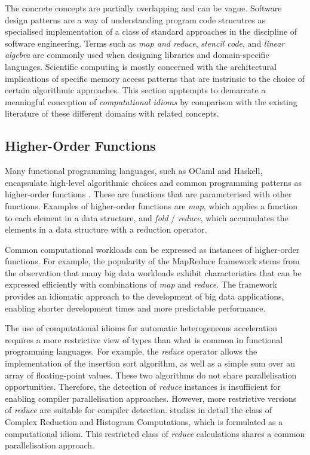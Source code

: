     The concrete concepts are partially overlapping and can be vague.
    Software design patterns are a way of understanding program code
    strucutres as specialised implementation of a class of standard approaches
    in the discipline of software engineering.
    Terms such as {\em map and reduce}, {\em stencil code}, and
    {\em linear algebra} are commonly used when designing libraries and
    domain-specific languages.
    Scientific computing is mostly concerned with the architectural
    implications of specific memory access patterns that are instrinsic to
    the choice of certain algorithmic approaches.
    This section apptempts to demarcate a meaningful conception of
    {\it computational idioms} by comparison with the existing literature of
    these different domains with related concepts.

\subsection{Higher-Order Functions}

    Many functional programming languages, such as OCaml and Haskell,
    encapsulate high-level algorithmic choices and common programming patterns
    as higher-order functions \citep{Hughes:1989:WFP:63410.63411}.
    These are functions that are parameterised with other functions.
    Examples of higher-order functions are {\it map}, which applies a function
    to each element in a data structure, and {\it fold} / {\it reduce}, which
    accumulates the elements in a data structure with a reduction operator.

    Common computational workloads can be expressed as instances of
    higher-order functions.
    For example, the popularity of the MapReduce framework
    \citep{Dean2008MapReduce} stems from the observation that many big data
    workloads exhibit characteristics that can be expressed efficiently with
    combinations of {\it map} and {\it reduce}.
    The framework provides an idiomatic approach to the development of big
    data applications, enabling shorter development times and more predictable
    performance.

    The use of computational idioms for automatic heterogeneous acceleration
    requires a more restrictive view of types than what is common in
    functional programming languages.
    For example, the {\it reduce} operator allows the implementation of
    the insertion sort algorithm, as well as a simple sum over an array of
    floating-point values.
    These two algorithms do not share parallelisation opportunities.
    Therefore, the detection of {\it reduce} instances is insufficient for
    enabling compiler parallelisation approaches.
    However, more restrictive versions of {\it reduce} are suitable for
    compiler detection.
     studies in detail the class of Complex Reduction
    and Histogram Computations, which is formulated as a computational idiom.
    This restricted class of {\it reduce} calculations shares a common
    parallelisation approach.

